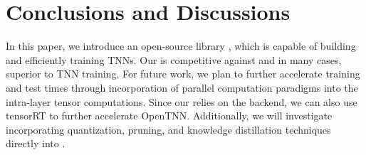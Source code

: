 \section{Conclusions and Discussions}
\label{sec:conclusion}

In this paper, we introduce an open-source library \autotnn, which is capable of building and efficiently training TNNs. Our \autotnn is competitive against and in many cases, superior to \pytorch TNN training.
For future work, we plan to further accelerate training and test times through incorporation of parallel computation paradigms into the intra-layer tensor computations. {Since our \autotnn relies on the \pytorch backend, we can also use tensorRT to further accelerate OpenTNN. Additionally, we will investigate incorporating quantization, pruning, and knowledge distillation techniques directly into \autotnn.}